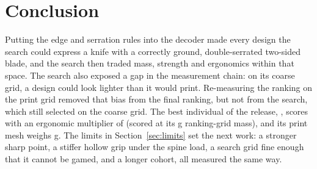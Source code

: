 \section{Conclusion}
Putting the edge and serration rules into the decoder made every design the search could express a knife with a
correctly ground, double-serrated two-sided blade, and the search then traded mass, strength and ergonomics within that
space. The search also exposed a gap in the measurement chain: on its coarse grid, a design could look lighter
than it would print. Re-measuring the ranking on the print grid removed that bias from the final ranking, but not from the search, which still
selected on the coarse grid. The best individual of
the release, \gDesign, scores \gScore{} with an ergonomic multiplier of \gE{} (scored at its \gMassRankG{} g
ranking-grid mass), and its print mesh weighs \gMassG{} g. The limits in
Section~\ref{sec:limits} set the next work: a stronger sharp point, a stiffer hollow grip under the spine load, a search
grid fine enough that it cannot be gamed, and a longer cohort, all measured the same way.
